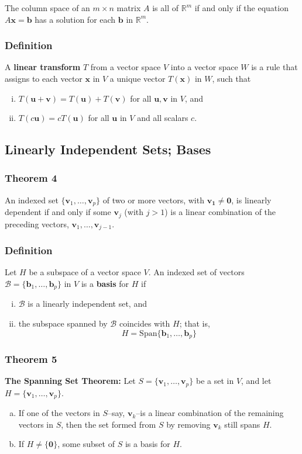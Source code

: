 \documentclass[letterpaper,11pt]{article}
\begin{document}
				The column space of an $m\times n$ matrix $A$ is all of $\mathbb{R}^m$ if and only if the equation $A\mathbf{x}=\mathbf{b}$ has a solution for each $\mathbf{b}$ in $\mathbb{R}^m$.
			\subsubsection{Definition}
				A \textbf{linear transform} $T$ from a vector space $V$ into a vector space $W$ is a rule that assigns to each vector $\mathbf{x}$ in $V$ a unique vector $T(\mathbf{x})$ in $W$, such that
				\begin{enumerate}[(i)]
					\item $T(\mathbf{u}+\mathbf{v})=T(\mathbf{u})+T(\mathbf{v})$ for all $\mathbf{u,v}$ in $V$, and
					\item $T(c\mathbf{u})=cT(\mathbf{u})$ for all $\mathbf{u}$ in $V$ and all scalars $c$.
				\end{enumerate}
		\subsection{Linearly Independent Sets; Bases}
			\subsubsection{Theorem 4}
				An indexed set $\{\mathbf{v}_1,\dots,\mathbf{v}_p\}$ of two or more vectors, with $\mathbf{v_1}\neq\mathbf{0}$, is linearly dependent if and only if some $\mathbf{v}_j$ (with $j>1$) is a linear combination of the preceding vectors, $\mathbf{v}_1,\dots,\mathbf{v}_{j-1}$.
			\subsubsection{Definition}
				Let $H$ be a subspace of a vector space $V$. An indexed set of vectors $\mathcal{B}=\{\mathbf{b}_1,\dots,\mathbf{b}_p\}$ in $V$ is a \textbf{basis} for $H$ if
				\begin{enumerate}[(i)]
					\item $\mathcal{B}$ is a linearly independent set, and
					\item the subspace spanned by $\mathcal{B}$ coincides with $H$; that is,
						\begin{equation}
							H=\textrm{Span}\{\mathbf{b}_1,\dots,\mathbf{b}_p\}
						\end{equation}
				\end{enumerate}
			\subsubsection{Theorem 5}
				\textbf{The Spanning Set Theorem:} Let $S=\{\mathbf{v}_1,\dots,\mathbf{v}_p\}$ be a set in $V$, and let $H=\{\mathbf{v}_1,\dots,\mathbf{v}_p\}$.
				\begin{enumerate}[a.]
					\item If one of the vectors in $S$--say, $\mathbf{v}_k$--is a linear combination of the remaining vectors in $S$, then the set formed from $S$ by removing $\mathbf{v}_k$ still spans $H$.
					\item If $H\neq\{\mathbf{0}\}$, some subset of $S$ is a basis for $H$.
				\end{enumerate}
				
\end{document}
